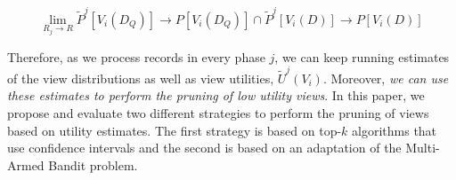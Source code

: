 $$\lim_{R_j \rightarrow R}\widetilde{P}^j[V_i (D_Q)] \rightarrow P[V_i (D_Q)] \cap 
\widetilde{P}^j[V_i (D)] \rightarrow P[V_i (D)] $$


Therefore, as we process records in every phase $j$, we can keep running estimates of the
view distributions as well as view utilities, $\widetilde{U}^j(V_i)$.
Moreover, {\it we can use these estimates to perform the pruning of low utility views}.
In this paper, we propose and evaluate two different strategies
to perform the pruning of views based on utility estimates. 
The first strategy is based on top-$k$ algorithms that use confidence intervals 
and the second is based on an adaptation of the Multi-Armed Bandit problem.



